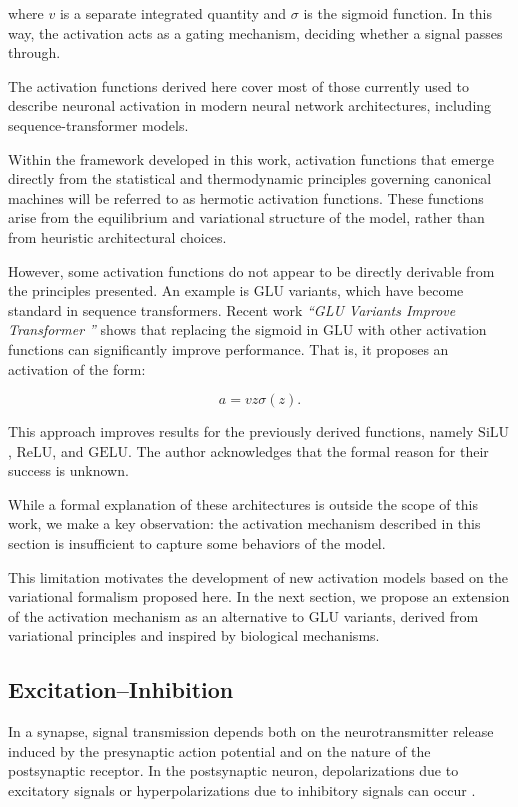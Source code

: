 \documentclass[12pt]{article}
\begin{document}
where $v$ is a separate integrated quantity and $\sigma$ is the sigmoid function. In this way, the activation acts as a gating mechanism, deciding whether a signal passes through.

The activation functions derived here cover most of those currently used to describe neuronal activation in modern neural network architectures, including sequence-transformer models.

Within the framework developed in this work, activation functions that emerge directly from the statistical and thermodynamic principles governing canonical machines will be referred to as hermotic activation functions. These functions arise from the equilibrium and variational structure of the model, rather than from heuristic architectural choices.

However, some activation functions do not appear to be directly derivable from the principles presented. An example is $\text{GLU}$ variants, which have become standard in sequence transformers. Recent work \emph{“GLU Variants Improve Transformer ”} \cite{shazeer2020glu} shows that replacing the sigmoid in $\text{GLU}$ with other activation functions can significantly improve performance. That is, it proposes an activation of the form:

\begin{equation}
a = v z \sigma(z) .
\end{equation}

This approach improves results for the previously derived functions, namely $\text{SiLU}$, $\text{ReLU}$, and $\text{GELU}$. The author acknowledges that the formal reason for their success is unknown.
  
While a formal explanation of these architectures is outside the scope of this work, we make a key observation: the activation mechanism described in this section is insufficient to capture some behaviors of the model.

This limitation motivates the development of new activation models based on the variational formalism proposed here. In the next section, we propose an extension of the activation mechanism as an alternative to $\text{GLU}$ variants, derived from variational principles and inspired by biological mechanisms.
\subsection*{Excitation–Inhibition}

In a synapse, signal transmission depends both on the neurotransmitter release induced by the presynaptic action potential and on the nature of the postsynaptic receptor. In the postsynaptic neuron, depolarizations due to excitatory signals or hyperpolarizations due to inhibitory signals can occur \cite{dayan2001theoretical}.
\end{document}
